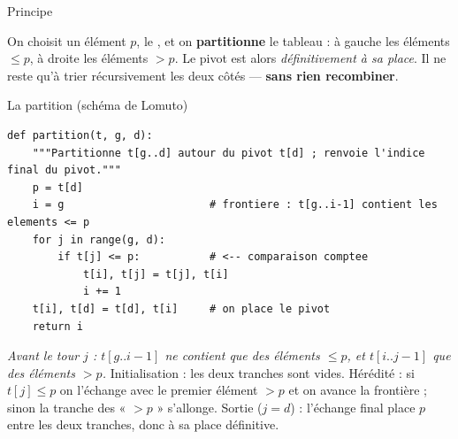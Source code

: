 \documentclass[11pt,aspectratio=169]{beamer}
\begin{document}
\begin{frame}{Principe}
\begin{encadre}[title=Idée,fonttitle=\bfseries]
On choisit un élément $p$, le , et on \textbf{partitionne} le tableau :
à gauche les éléments $\le p$, à droite les éléments $>p$. Le pivot est alors
\emph{définitivement à sa place}. Il ne reste qu'à trier récursivement les deux côtés ---
\textbf{sans rien recombiner}.
\end{encadre}
\vspace{6pt}
\begin{center}
\end{center}
\end{frame}

\begin{frame}[fragile]{La partition (schéma de Lomuto)}
\begin{lstlisting}
def partition(t, g, d):
    """Partitionne t[g..d] autour du pivot t[d] ; renvoie l'indice final du pivot."""
    p = t[d]
    i = g                       # frontiere : t[g..i-1] contient les elements <= p
    for j in range(g, d):
        if t[j] <= p:           # <-- comparaison comptee
            t[i], t[j] = t[j], t[i]
            i += 1
    t[i], t[d] = t[d], t[i]     # on place le pivot
    return i
\end{lstlisting}
\begin{correction}
\small
\emph{Avant le tour $j$ : $t[g..i-1]$ ne contient que des éléments $\le p$, et
$t[i..j-1]$ que des éléments $>p$.} Initialisation : les deux tranches sont vides.
Hérédité : si $t[j]\le p$ on l'échange avec le premier élément $>p$ et on avance la
frontière ; sinon la tranche des « $>p$ » s'allonge. Sortie ($j=d$) : l'échange final place
$p$ entre les deux tranches, donc à sa place définitive.
\end{correction}
\end{frame}
\end{document}
